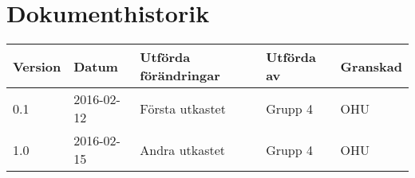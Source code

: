 \documentclass[11pt]{article}
\begin{document}
\tableofcontents

\pagebreak
\section*{Dokumenthistorik}
\begin{table}[h]
\begin{tabular}{|l|l|l|l|l|} \hline

\textbf{Version} & \textbf{Datum} & \textbf{Utförda förändringar} & \textbf{Utförda av} & \textbf{Granskad} \\ \hline
0.1 & 2016-02-12 &  Första utkastet & Grupp 4 & OHU \\ \hline
1.0 & 2016-02-15 &  Andra utkastet & Grupp 4 & OHU \\ \hline
\end{tabular}
\end{table}

\pagebreak
{}
\end{document}
